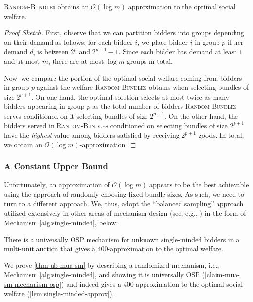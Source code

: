 \begin{theorem}\label{claim:ascending-bundles-approx}
{\textsc{Random-Bundles}} obtains an $\mathcal O(\log{m})$ approximation to the optimal social welfare.
\end{theorem}
\begin{proof}[Proof Sketch]
First, observe that we can partition bidders into groups depending on their demand as follows:  for each bidder $i$, we place bidder $i$ in group $p$ if her demand  $d_i$ is between $2^{p}$ and $2^{p+1}-1$.
Since each bidder has demand at least $1$ and at most $m$, there are at most $\log{m}$ groups in total.  

Now, we  compare the portion of the optimal social welfare coming from bidders in group $p$ against the welfare \textsc{Random-Bundles} obtains when
 selecting bundles of size $2^{p+1}$.  On one hand, the optimal solution selects at most twice as many bidders appearing in group $p$ as the total number of bidders \textsc{Random-Bundles} serves conditioned on it selecting bundles of size $2^{p+1}$.  On the other hand, the bidders served in \textsc{Random-Bundles} conditioned on selecting bundles of size $2^{p+1}$ have the \emph{highest} value among bidders satisfied by receiving $2^{p+1}$ goods.  In total, we obtain an $\mathcal O(\log{m})$-approximation.
\end{proof}

\subsubsection{A Constant Upper Bound }\label{subsub::actual-ub-mua-sm}
Unfortunately, an approximation of $\mathcal O(\log m)$ appears to be the best achievable using the approach of randomly choosing fixed bundle sizes.  As such, we need to turn to a different approach.  We, thus, adopt the ``balanced sampling'' approach utilized extensively in other areas of mechanism design (see, e.g., \cite{feige2005competitive,goldberg2006competitive,dobzinski2012truthful,dobzinski2007two,badanidiyuru2012learning,bei2017worst})  in the form of Mechanism \ref{alg:single-minded},  below:

\begin{theorem}\label{thm-ub-mua-sm}
        There is a universally OSP mechanism for unknown single-minded bidders in a multi-unit auction  that gives a $400$-approximation to the optimal welfare.
\end{theorem}
We prove \cref{thm-ub-mua-sm} by describing a randomized mechanism, i.e., Mechanism \ref{alg:single-minded}, and showing it is universally OSP (\cref{claim-mua-sm-mechanism-osp}) and indeed gives a $400$-approximation to the optimal social welfare (\cref{lem:single-minded-approx}). 


